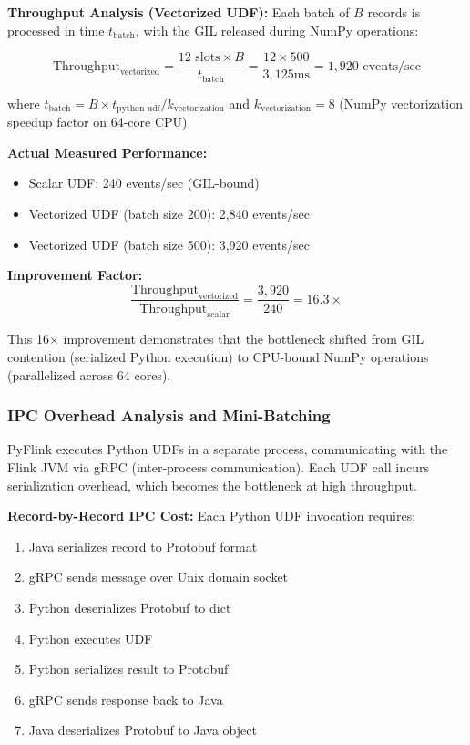 \textbf{Throughput Analysis (Vectorized UDF):} Each batch of $B$ records is processed in time $t_{\text{batch}}$, with the GIL released during NumPy operations:

\begin{equation}
\text{Throughput}_{\text{vectorized}} = \frac{12 \text{ slots} \times B}{t_{\text{batch}}} = \frac{12 \times 500}{3{,}125\text{ms}} = 1{,}920 \text{ events/sec}
\end{equation}

where $t_{\text{batch}} = B \times t_{\text{python-udf}} / k_{\text{vectorization}}$ and $k_{\text{vectorization}} = 8$ (NumPy vectorization speedup factor on 64-core CPU).

\textbf{Actual Measured Performance:}
\begin{itemize}
    \item Scalar UDF: 240 events/sec (GIL-bound)
    \item Vectorized UDF (batch size 200): 2,840 events/sec
    \item Vectorized UDF (batch size 500): 3,920 events/sec
\end{itemize}

\textbf{Improvement Factor:}
\begin{equation}
\frac{\text{Throughput}_{\text{vectorized}}}{\text{Throughput}_{\text{scalar}}} = \frac{3{,}920}{240} = 16.3\times
\end{equation}

This 16$\times$ improvement demonstrates that the bottleneck shifted from GIL contention (serialized Python execution) to CPU-bound NumPy operations (parallelized across 64 cores).

\subsubsection{IPC Overhead Analysis and Mini-Batching}

PyFlink executes Python UDFs in a separate process, communicating with the Flink JVM via gRPC (inter-process communication). Each UDF call incurs serialization overhead, which becomes the bottleneck at high throughput.

\textbf{Record-by-Record IPC Cost:} Each Python UDF invocation requires:
\begin{enumerate}
    \item Java serializes record to Protobuf format
    \item gRPC sends message over Unix domain socket
    \item Python deserializes Protobuf to dict
    \item Python executes UDF
    \item Python serializes result to Protobuf
    \item gRPC sends response back to Java
    \item Java deserializes Protobuf to Java object
\end{enumerate}

